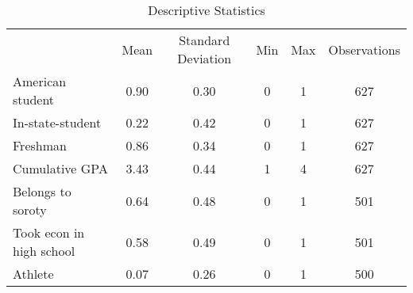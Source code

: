 \begin{table}
\caption{Descriptive Statistics}
\begin{tabular}{lccccc}
 & Mean & Standard Deviation & Min & Max & Observations \\
American student & 0.90 & 0.30 & 0 & 1 & 627 \\
In-state-student & 0.22 & 0.42 & 0 & 1 & 627 \\
Freshman & 0.86 & 0.34 & 0 & 1 & 627 \\
Cumulative GPA & 3.43 & 0.44 & 1 & 4 & 627 \\
Belongs to soroty & 0.64 & 0.48 & 0 & 1 & 501 \\
Took econ in high school & 0.58 & 0.49 & 0 & 1 & 501 \\
Athlete & 0.07 & 0.26 & 0 & 1 & 500 \\
\end{tabular}
\end{table}
